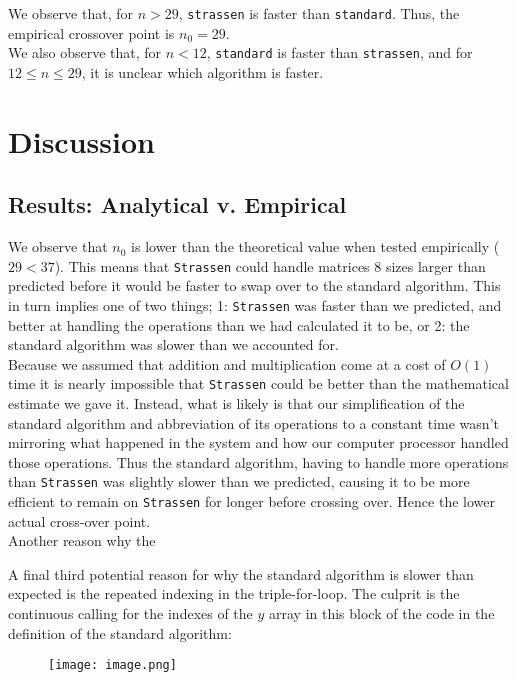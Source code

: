 \documentclass[11pt]{scrartcl}
\theoremstyle{dotlessP}
\theoremstyle{dotlessN}
\theoremstyle{dotN}
\begin{document}
We observe that, for $n > 29$, \texttt{strassen} is faster than \texttt{standard}. Thus, the empirical crossover point is $n_0 = 29$. 
\\

We also observe that, for $n < 12$, \texttt{standard} is faster than \texttt{strassen}, and for $12 \leq n \leq 29$, it is unclear which algorithm is faster.

\section{Discussion}
\subsection{Results: Analytical v. Empirical}
We observe that $n_0$ is lower than the theoretical value when tested empirically ($29 < 37$). This means that \texttt{Strassen} could handle matrices 8 sizes larger than predicted before it would be faster to swap over to the standard algorithm. This in turn implies one of two things; 1: \texttt{Strassen} was faster than we predicted, and better at handling the operations than we had calculated it to be, or 2: the standard algorithm was slower than we accounted for. \\

Because we assumed that addition and multiplication come at a cost of $O(1)$ time it is nearly impossible that \texttt{Strassen} could be better than the mathematical estimate we gave it. Instead, what is likely is that our simplification of the standard algorithm and abbreviation of its operations to a constant time wasn't mirroring what happened in the system and how our computer processor handled those operations. Thus the standard algorithm, having to handle more operations than \texttt{Strassen} was slightly slower than we predicted, causing it to be more efficient to remain on \texttt{Strassen} for longer before crossing over. Hence the lower actual cross-over point. \\

Another reason why the 


A final third potential reason for why the standard algorithm is slower than expected is the repeated indexing in the triple-for-loop. The culprit is the continuous calling for the indexes of the $y$ array in this block of the code in the definition of the standard algorithm:

\begin{figure}
    \centering
    \texttt{[image: image.png]}
    \label{fig:enter-label}
\end{figure}
\end{document}

